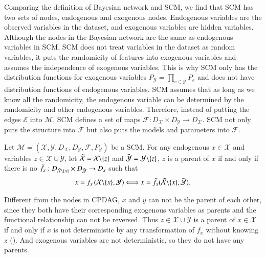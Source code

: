 \documentclass[twoside,11pt]{article}
\begin{document}
Comparing the definition of Bayesian network and SCM, we find that SCM has two sets of nodes, endogenous and exogenous nodes. Endogenous variables are the observed variables in the dataset, and exogenous variables are hidden variables. Although the nodes in the Bayesian network are the same as endogenous variables in SCM, SCM does not treat variables in the dataset as random variables, it puts the randomicity of features into exogenous variables and assumes the independence of exogenous variables. This is why SCM only has the distribution functions for exogenous variables $P_\mathcal Y=\underset{e\in\mathcal Y}{\prod}P_e$ and does not have distribution functions of endogenous variables. SCM assumes that as long as we know all the randomicity, the endogenous variable can be determined by the randomicity and other endogenous variables. Therefore, instead of putting the edges $\mathcal E$ into $\mathcal M$, SCM defines a set of maps $\mathcal F: D_\mathcal X\times D_\mathcal Y\to D_\mathcal X$. SCM not only puts the structure into $\mathcal F$ but also puts the models and parameters into $\mathcal F$.

\begin{definition}
\label{SCM-parent}
Let $\mathcal M=(\mathcal X, \mathcal Y, D_\mathcal X, D_\mathcal Y, \mathcal F, P_\mathcal Y)$ be a SCM. For any endogenous $x\in\mathcal X$ and variables $z\in\mathcal X\cup\mathcal Y$, let $\Tilde{\mathcal X}=\mathcal X\backslash\{z\}$ and $\Tilde{\mathcal Y}=\mathcal Y\backslash\{z\}$, $z$ is a parent of $x$ if and only if there is no $\Tilde f_x: D_{\Tilde{\mathcal X}\backslash\{x\}}\times D_{\Tilde{\mathcal Y}}\to D_x$ such that
\begin{align*}
    x=f_x\left(\mathcal X\backslash\{x\}, \mathcal Y\right) \Longleftrightarrow x=\tilde f_x(\Tilde{\mathcal X}\backslash\{x\}, \Tilde{\mathcal Y}).
\end{align*}
\end{definition}
Different from the nodes in CPDAG, $x$ and $y$ can not be the parent of each other, since they both have their corresponding exogenous variables as parents and the functional relationship can not be reversed.
Thus $z\in\mathcal X\cup\mathcal Y$ is a parent of $x\in\mathcal X$ if and only if $x$ is not deterministic by any transformation of $f_x$ without knowing $z$ (\cite{olkopf2016foundations}). And exogenous variables are not deterministic, so they do not have any parents.
\end{document}
